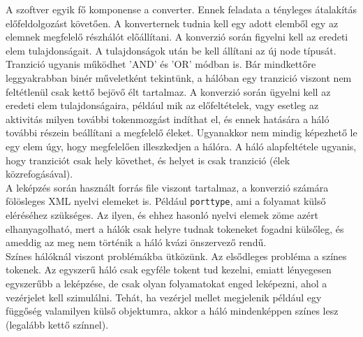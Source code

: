 
A szoftver egyik fő komponense a converter. Ennek feladata a tényleges átalakítás előfeldolgozást követően.  A konverternek tudnia kell egy adott elemből egy az elemnek megfelelő részhálót előállítani. A konverzió során figyelni kell az eredeti elem tulajdonságait. A tulajdonságok után be kell állítani az új node típusát. Tranzició ugyanis működhet 'AND' és 'OR' módban is. Bár mindkettőre leggyakrabban binér műveletként tekintünk, a hálóban egy tranzició viszont nem feltétlenül csak kettő bejövő élt tartalmaz. A konverzió során ügyelni kell az eredeti elem tulajdonságaira, például mik az előfeltételek, vagy esetleg az aktivitás milyen további tokenmozgást indíthat el, és ennek hatására a háló további részein beállítani a megfelelő éleket. Ugyanakkor nem mindig képezhető le egy elem úgy, hogy megfelelően illeszkedjen a hálóra. A háló alapfeltétele ugyanis, hogy tranziciót csak hely követhet, és helyet is csak tranzició (élek közrefogásával).\\
A leképzés során használt forrás file viszont tartalmaz, a konverzió számára fölösleges XML nyelvi elemeket is. Például \texttt{porttype}, ami a folyamat külső eléréséhez szükséges. Az ilyen, és ehhez hasonló nyelvi elemek zöme azért elhanyagolható, mert a hálók csak helyre tudnak tokeneket fogadni külsőleg, és ameddig az meg nem történik a háló kvázi önszervező rendű.\\
Színes hálóknál viszont problémákba ütközünk. Az elsődleges probléma a színes tokenek. Az egyszerű háló csak egyféle tokent tud kezelni, emiatt lényegesen egyszerűbb a leképzése, de csak olyan folyamatokat enged leképezni, ahol a vezérjelet kell szimulálni. Tehát, ha vezérjel mellet megjelenik például egy függőség valamilyen külső objektumra, akkor a háló mindenképpen színes lesz (legalább kettő színnel). \\

